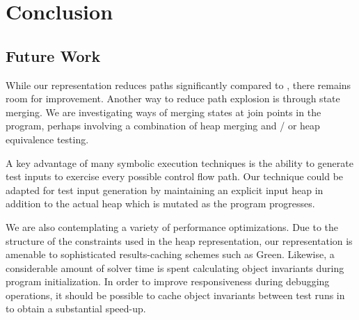 \section{Conclusion}

\subsection{Future Work}
While our representation reduces paths significantly compared to \gsetxt{}, there remains room for improvement. Another way to reduce path explosion is through state merging. We are investigating ways of merging states at join points in the program, perhaps involving a combination of heap merging and / or heap equivalence testing.

A key advantage of many symbolic execution techniques is the ability to generate test inputs to exercise every possible control flow path. Our technique could be adapted for test input generation by maintaining an explicit input heap in addition to the actual heap which is mutated as the program progresses. 

We are also contemplating a variety of performance optimizations. Due to the structure of the constraints used in the heap representation, our representation is amenable to sophisticated results-caching schemes such as Green. Likewise, a considerable amount of solver time is spent calculating object invariants during program initialization. In order to improve responsiveness during debugging operations, it should be possible to cache object invariants between test runs in to obtain a substantial speed-up.